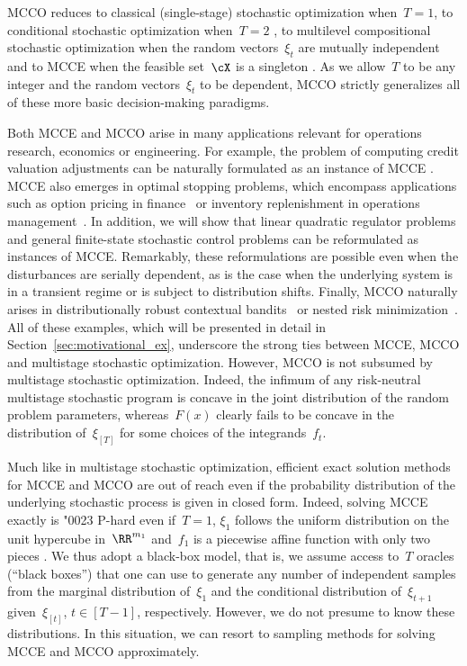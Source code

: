 \documentclass[11pt]{article}
\begin{document}
MCCO reduces to classical (single-stage) stochastic optimization when~$T=1$, to conditional stochastic optimization when~$T=2$ \citep{dai2017learning, hu2020biased, hu2021bias, hu2020sample, goda2023constructing, he2023debiasing}, to multilevel compositional stochastic optimization when the random vectors~$\xi_t$ are mutually independent \citep{jiang2022optimal, gao2024decentralized, xiao2022projection, cong2020minimal, zhang2021multilevel, yang2019multilevel, balasubramanian2022stochastic, ruszczynski2021stochastic, chen2021solving} and to MCCE when the feasible set~$\cX$ is a singleton \citep{rainforth2018nesting,syed2023optimal,zhou2022unbiased}. As we allow~$T$ to be any integer and the random vectors~$\xi_t$ to be  dependent, MCCO strictly generalizes all of these more basic decision-making paradigms. 

Both MCCE and MCCO arise in many applications relevant for operations research, economics or engineering. For example, the problem of computing credit valuation adjustments can be naturally formulated as an instance of MCCE \cite{giles2023efficient}. MCCE also emerges in optimal stopping problems, which encompass applications such as option pricing in finance~\citep{zhou2022unbiased} or inventory replenishment in operations management~\citep{ozyoruk2022end}. In addition, we will show that linear quadratic regulator problems and general finite-state stochastic control problems can be reformulated as instances of MCCE. Remarkably, these reformulations are possible even when the disturbances are serially dependent, as is the case when the underlying system is in a transient regime or is subject to distribution shifts. Finally, MCCO naturally arises in distributionally robust contextual bandits~\citep{shen2024wasserstein} or nested risk minimization~\citep{wang2024bayesian}. All of these examples, which will be presented in detail in Section~\ref{sec:motivational_ex}, underscore the strong ties between MCCE, MCCO and multistage stochastic optimization. However, MCCO is not subsumed by multistage stochastic optimization. Indeed, the infimum of any risk-neutral multistage stochastic program is concave in the joint distribution of the random problem parameters, whereas~$F(x)$ clearly fails to be concave in the distribution of~$\xi_{[T]}$ for some choices of the integrands~$f_t$. 


Much like in multistage stochastic optimization, efficient exact solution methods for MCCE and MCCO are out of reach even if the probability distribution of the underlying stochastic process is given in closed form. Indeed, solving MCCE exactly is \char"0023 P-hard even if~$T=1$, $\xi_1$ follows the uniform distribution on the unit hypercube in~$\RR^{m_1}$ and~$f_1$ is a piecewise affine function with only two pieces \citep[Corollary~1]{hanasusanto2016comment}. We thus adopt a black-box model, that is, we assume access to~$T$ oracles (``black boxes'') that one can use to generate any number of independent samples from the marginal distribution of~$\xi_1$ and the conditional distribution of~$\xi_{t+1}$ given~$\xi_{[t]}$, $t\in[T-1]$, respectively. However, we do not presume to know these distributions. In this situation, we can resort to sampling methods for solving MCCE and MCCO approximately.
\end{document}
